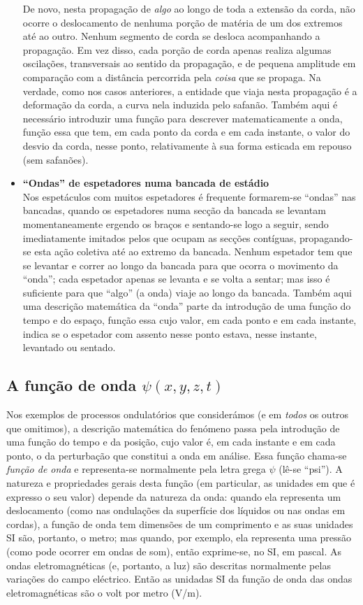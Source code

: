 \begin{itemize}
    De novo, nesta propagação de \emph{algo} ao longo de toda a extensão da
    corda, não ocorre o deslocamento de nenhuma porção de matéria de um dos
    extremos até ao outro. Nenhum segmento de corda se desloca acompanhando a
    propagação. Em vez disso, cada porção de corda apenas realiza algumas
    oscilações, transversais ao sentido da propagação, e de pequena amplitude em
    compa\-ração com a distância percorrida pela \emph{coisa} que se propaga. Na
    verdade, como nos casos anteriores, a entidade que viaja nesta propagação é
    a deformação da corda, a curva nela induzida pelo safanão. Também aqui é
    necessário introduzir uma função para descrever matematicamente a onda,
    função essa que tem, em cada ponto da corda e em cada instante, o valor do
    desvio da corda, nesse ponto, relativamente à sua forma esticada em repouso
    (sem safanões).

\item \textbf{``Ondas'' de espetadores numa bancada de estádio}\\
Nos espetáculos com muitos espetadores é frequente formarem-se ``ondas''
nas bancadas, quando os espetadores numa secção da bancada se levantam
momentaneamente ergendo os braços e sentando-se logo a seguir, sendo
imediatamente imitados pelos que ocupam as secções contíguas, propagando-se esta
ação coletiva até ao extremo da bancada. Nenhum espetador tem que se levantar e
correr ao longo da bancada para que ocorra o movimento da ``onda''; cada
espetador apenas se levanta e se volta a sentar; mas isso é suficiente para que
``algo'' (a onda) viaje ao longo da bancada. Também aqui uma descrição
matemática da ``onda'' parte da introdução de uma função do tempo e do espaço,
função essa cujo valor, em cada ponto e em cada instante, indica se o espetador
com assento nesse ponto estava, nesse instante, levantado ou sentado.
\end{itemize}

\subsection{A função de onda $\psi(x,y,z,t)$}
Nos exemplos de processos ondulatórios que considerámos (e em \emph{todos} os
outros que omitimos), a descrição matemática do fenómeno passa pela introdução
de uma função do tempo e da posição, cujo valor é, em cada instante e em cada
ponto, o da perturbação que constitui a onda em análise. Essa função chama-se
\emph{função de onda} e representa-se normalmente pela letra grega $\psi$ (lê-se
``psi''). A natureza e propriedades gerais desta função (em particular, as
unidades em que é expresso o seu valor) depende da natureza da onda: quando ela
representa um deslocamento (como nas ondulações da superfície dos líquidos ou
nas ondas em cordas), a função de onda tem dimensões de um comprimento e as suas
unidades SI são, portanto, o metro; mas quando, por exemplo, ela representa uma
pressão (como pode ocorrer em ondas de som), então exprime-se, no SI, em pascal.
As ondas eletromagnéticas (e, portanto, a luz) são descritas normalmente pelas
variações do campo eléctrico. Então as unidadas SI da função de onda das ondas
eletromagnéticas são o volt por metro (V/m).

